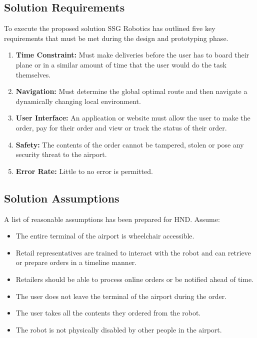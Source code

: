 \documentclass[letterpaper,fleqn,oneside]{template}
\begin{document}
\subsection{Solution Requirements}

To execute the proposed solution SSG Robotics has outlined five key requirements that must be met during the design and prototyping phase. 

\begin{enumerate}
    \item \textbf{Time Constraint:} Must make deliveries before the user has to board their plane or in a similar amount of time that the user would do the task themselves.
    \item \textbf{Navigation:} Must determine the global optimal route and then navigate a dynamically changing local environment.
    \item \textbf{User Interface:} An application or website must allow the user to make the order, pay for their order and view or track the status of their order.
    \item \textbf{Safety:} The contents of the order cannot be tampered, stolen or pose any security threat to the airport.
    \item \textbf{Error Rate:} Little to no error is permitted.
\end{enumerate}

\subsection{Solution Assumptions}

A list of reasonable assumptions has been prepared for HND. Assume:
\begin{itemize}
    \item The entire terminal of the airport is wheelchair accessible.
    \item Retail representatives are trained to interact with the robot and can retrieve or prepare orders in a timeline manner. 
    \item Retailers should be able to process online orders or be notified ahead of time. 
    \item The user does not leave the terminal of the airport during the order. 
    \item The user takes all the contents they ordered from the robot. 
    \item  The robot is not physically disabled by other people in the airport. 
\end{itemize}
\end{document}
